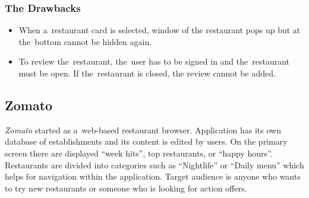 \subsubsection{The Drawbacks}
\begin{itemize}
    \item When a~restaurant card is selected, window of the restaurant pops up but at the~bottom cannot be hidden again.
    \item To review the~restaurant, the~user has to be signed in and the~restaurant must be open. If the~restaurant is closed, the review cannot be added.
\end{itemize}

\subsection{Zomato}
\textit{Zomato} started as a~web-based restaurant browser. Application has its own database of establishments and its content is edited by users.  
On the primary screen there are displayed ``week hits'', top restaurants, or ``happy hours''. Restaurants are divided into categories such as ``Nightlife'' or ``Daily menu'' which helps for navigation within the application.
Target audience is anyone who wants to try new restaurants or someone who is looking for action offers.



